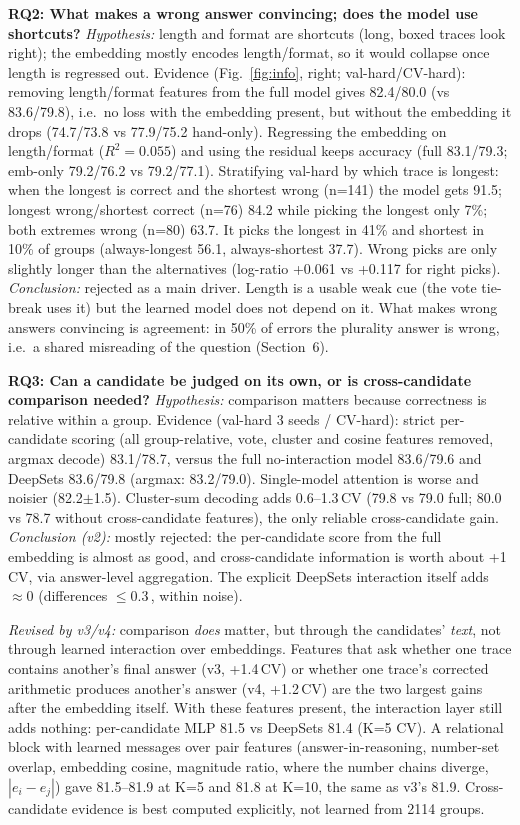 \documentclass[10pt,a4paper]{article}
\newcommand{\pt}{\,\text{pt}}
\begin{document}
\textbf{RQ2: What makes a wrong answer convincing; does the model use shortcuts?}
\emph{Hypothesis:} length and format are shortcuts (long, boxed traces look right); the embedding mostly encodes length/format, so it would collapse once length is regressed out.
Evidence (Fig.~\ref{fig:info}, right; val-hard/CV-hard): removing length/format features from the full model gives 82.4/80.0 (vs 83.6/79.8), i.e.\ no loss with the embedding present, but without the embedding it drops (74.7/73.8 vs 77.9/75.2 hand-only). Regressing the embedding on length/format ($R^2=0.055$) and using the residual keeps accuracy (full 83.1/79.3; emb-only 79.2/76.2 vs 79.2/77.1). Stratifying val-hard by which trace is longest: when the longest is correct and the shortest wrong (n=141) the model gets 91.5; longest wrong/shortest correct (n=76) 84.2 while picking the longest only 7\%; both extremes wrong (n=80) 63.7. It picks the longest in 41\% and shortest in 10\% of groups (always-longest 56.1, always-shortest 37.7). Wrong picks are only slightly longer than the alternatives (log-ratio +0.061 vs +0.117 for right picks).
\emph{Conclusion:} rejected as a main driver. Length is a usable weak cue (the vote tie-break uses it) but the learned model does not depend on it. What makes wrong answers convincing is agreement: in 50\% of errors the plurality answer is wrong, i.e.\ a shared misreading of the question (Section~6).

\textbf{RQ3: Can a candidate be judged on its own, or is cross-candidate comparison needed?}
\emph{Hypothesis:} comparison matters because correctness is relative within a group.
Evidence (val-hard 3 seeds / CV-hard): strict per-candidate scoring (all group-relative, vote, cluster and cosine features removed, argmax decode) 83.1/78.7, versus the full no-interaction model 83.6/79.6 and DeepSets 83.6/79.8 (argmax: 83.2/79.0). Single-model attention is worse and noisier (82.2$\pm$1.5). Cluster-sum decoding adds 0.6--1.3\pt CV (79.8 vs 79.0 full; 80.0 vs 78.7 without cross-candidate features), the only reliable cross-candidate gain.
\emph{Conclusion (v2):} mostly rejected: the per-candidate score from the full embedding is almost as good, and cross-candidate information is worth about +1\pt CV, via answer-level aggregation. The explicit DeepSets interaction itself adds $\approx0$ (differences $\le0.3$\pt, within noise).

\emph{Revised by v3/v4:} comparison \emph{does} matter, but through the candidates' \emph{text}, not through learned interaction over embeddings. Features that ask whether one trace contains another's final answer (v3, +1.4\pt CV) or whether one trace's corrected arithmetic produces another's answer (v4, +1.2\pt CV) are the two largest gains after the embedding itself. With these features present, the interaction layer still adds nothing: per-candidate MLP 81.5 vs DeepSets 81.4 (K=5 CV). A relational block with learned messages over pair features (answer-in-reasoning, number-set overlap, embedding cosine, magnitude ratio, where the number chains diverge, $|e_i-e_j|$) gave 81.5--81.9 at K=5 and 81.8 at K=10, the same as v3's 81.9. Cross-candidate evidence is best computed explicitly, not learned from 2114 groups.
\end{document}
